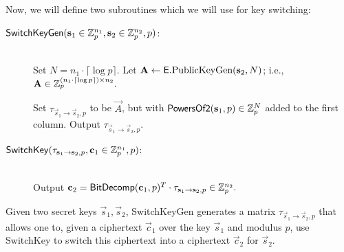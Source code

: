     Now, we will define two subroutines which we will use for key switching:
    \begin{description}
        \item[${\sf SwitchKeyGen}(\vec{s}_1 \in \Z_p^{n_1}, \vec{s}_2 \in \Z_p^{n_2}, p)$:] \ \\ Set $N = n_1 \cdot \lceil \log p \rceil$.
         Let $\vec{A} \leftarrow {\sf E}.\text{PublicKeyGen}(\vec{s}_2, N)$; i.e., $\vec{A} \in \Z_p^{(n_1 \cdot \lceil \log p \rceil) \times n_2}.$

         Set $\tau_{\vec{s}_1 \to \vec{s}_2, p}$ to be $\vec{A}$, but with ${\sf PowersOf2}(\vec{s}_1, p) \in \Z_p^N$ added to the first column. Output $\tau_{\vec{s}_1 \to \vec{s}_2, p}$.

         \item[${\sf SwitchKey}(\tau_{\vec{s}_1 \to \vec{s}_2, p}, \vec{c}_1 \in \Z_p^{n_1}, p)$:]\ \\ Output $\vec{c}_2 = {\sf BitDecomp}(\vec{c}_1, p)^T \cdot \tau_{\vec{s}_1 \to \vec{s}_2, p} \in \Z_p^{n_2}.$
    \end{description}

    Given two secret keys $\vec{s}_1, \vec{s}_2$, \textsf{SwitchKeyGen} generates a matrix $\tau_{\vec{s}_1 \to \vec{s}_2, p}$ that allows one to, given a ciphertext $\vec{c}_1$ over the key $\vec{s}_1$ and modulus $p$, use \textsf{SwitchKey} to switch this ciphertext into a ciphertext $\vec{c}_2$ for $\vec{s}_2$.

